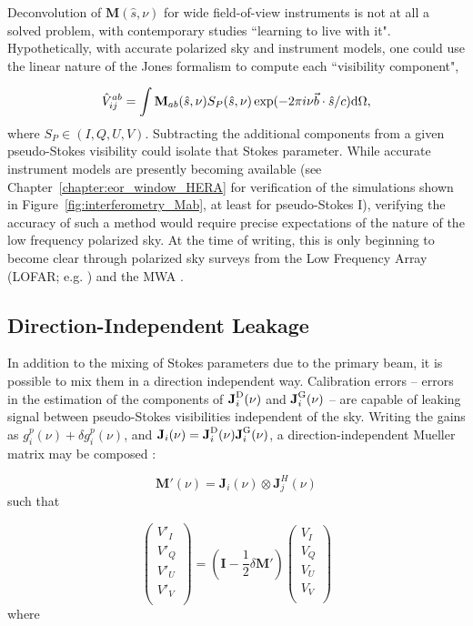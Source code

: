 Deconvolution of $\textbf{M}(\hat{s},\nu)$ for wide field-of-view instruments is not at all a solved problem, with contemporary studies ``learning to live with it". Hypothetically, with accurate polarized sky and instrument models, one could use the linear nature of the Jones formalism to compute each ``visibility component",

\begin{equation}
\hat{V}^{ab}_{ij} = \int \textbf{M}_{ab}(\hat{s},\nu)S_P(\hat{s},\nu)\exp(-2\pi i \nu \vec{b}\cdot\hat{s}/c) {\rm d}\Omega,
\end{equation}
where $S_P \in (I, Q, U, V)$. Subtracting the additional components from a given pseudo-Stokes visibility could isolate that Stokes parameter. While accurate instrument models are presently becoming available (see Chapter~\ref{chapter:eor_window_HERA} for verification of the simulations shown in Figure~\ref{fig:interferometry_Mab}, at least for pseudo-Stokes I), verifying the accuracy of such a method would require precise expectations of the nature of the low frequency polarized sky. At the time of writing, this is only beginning to become clear through polarized sky surveys from the Low Frequency Array (LOFAR; e.g. \citet{VanEck.18}) and the MWA \citep[e.g.][]{Lenc.16, Lenc.17}.

\subsection{Direction-Independent Leakage}

In addition to the mixing of Stokes parameters due to the primary beam, it is possible to mix them in a direction independent way. Calibration errors -- errors in the estimation of the components of $\textbf{J}_i^{\rm D}(\nu)$ and $\textbf{J}_i^{\rm G}(\nu)$ -- are capable of leaking signal between pseudo-Stokes visibilities independent of the sky. Writing the gains as $g_i^p(\nu) + \delta g_i^p(\nu)$, and $\textbf{J}_i (\nu)=\textbf{J}_i^{\rm D}(\nu)\textbf{J}_i^{\rm G}(\nu)$,  a direction-independent Mueller matrix may be composed \citep{TMS}:

\begin{equation}
\textbf{M}'(\nu) = \textbf{J}_i (\nu) \otimes \textbf{J}_j^H (\nu)
\end{equation}
such that

\begin{equation}
\begin{pmatrix}
V'_I \\
V'_Q \\
V'_U \\
V'_V \\
\end{pmatrix}
=
(\textbf{I} - \frac{1}{2}\delta\textbf{M}')
\begin{pmatrix}
V_I \\
V_Q \\
V_U \\
V_V \\
\end{pmatrix}
\end{equation}
where

